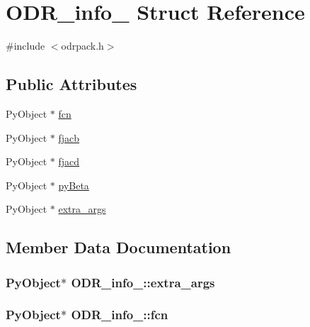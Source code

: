 \hypertarget{structODR__info__}{}\section{O\+D\+R\+\_\+info\+\_\+ Struct Reference}
\label{structODR__info__}


{\ttfamily \#include $<$odrpack.\+h$>$}

\subsection*{Public Attributes}
\begin{DoxyCompactItemize}
\item 
Py\+Object $\ast$ \hyperlink{structODR__info___aa0592dae8ebf5113671dfd17560dc277}{fcn}
\item 
Py\+Object $\ast$ \hyperlink{structODR__info___a78a055cec8ab46ee5a74b5c3f73e023a}{fjacb}
\item 
Py\+Object $\ast$ \hyperlink{structODR__info___ac4baf6dfdeb227c252eb18a8fa8a83b4}{fjacd}
\item 
Py\+Object $\ast$ \hyperlink{structODR__info___a06561c8fbe68a612e9e536774914c895}{py\+Beta}
\item 
Py\+Object $\ast$ \hyperlink{structODR__info___a34f1839d84894cf9af857f475e96b793}{extra\+\_\+args}
\end{DoxyCompactItemize}


\subsection{Member Data Documentation}
\hypertarget{structODR__info___a34f1839d84894cf9af857f475e96b793}{}
\subsubsection[{extra\+\_\+args}]{\setlength{\rightskip}{0pt plus 5cm}Py\+Object$\ast$ O\+D\+R\+\_\+info\+\_\+\+::extra\+\_\+args}\label{structODR__info___a34f1839d84894cf9af857f475e96b793}
\hypertarget{structODR__info___aa0592dae8ebf5113671dfd17560dc277}{}
\subsubsection[{fcn}]{\setlength{\rightskip}{0pt plus 5cm}Py\+Object$\ast$ O\+D\+R\+\_\+info\+\_\+\+::fcn}\label{structODR__info___aa0592dae8ebf5113671dfd17560dc277}
\hypertarget{structODR__info___a78a055cec8ab46ee5a74b5c3f73e023a}{}
